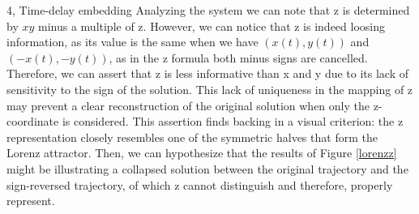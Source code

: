 \begin{task}{4, Time-delay embedding}
Analyzing the system we can note that z is determined by \(xy\) minus a multiple of z. However, we can notice that z is indeed loosing information, as its value is the same when we have \((x(t),y(t))\) and \((-x(t), -y(t))\), as in the z formula both minus signs are cancelled. Therefore, we can assert that z is less informative than x and y due to its lack of sensitivity to the sign of the solution. This lack of uniqueness in the mapping of z may prevent a clear reconstruction of the original solution when only the z-coordinate is considered. This assertion finds backing in a visual criterion: the z representation closely resembles one of the symmetric halves that form the Lorenz attractor. Then, we can hypothesize that the results of Figure \ref{lorenzz} might be illustrating a collapsed solution between the original trajectory and the sign-reversed trajectory, of which z cannot distinguish and therefore, properly represent. 
\end{task}